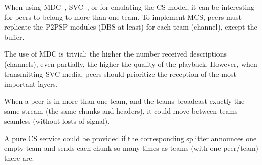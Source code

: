 When using MDC~\cite{baccichet2007content}, SVC~\cite{chu2009auction},
or for emulating the CS model, it can be interesting for peers to
belong to more than one team. To implement MCS, peers must replicate
the P2PSP modules (DBS at least) for each team (channel), except the
buffer.

The use of MDC is trivial: the higher the number received descriptions
(channels), even partially, the higher the quality of the
playback. However, when transmitting SVC media, peers should
prioritize the reception of the most important layers.

When a peer is in more than one team, and the teams broadcast exactly
the same stream (the same chunks and headers), it could move between
teams seamless (without losts of signal).

A pure CS service could be provided if the corresponding splitter
announces one empty team and sends each chunk so many times as teams
(with one peer/team) there are.
